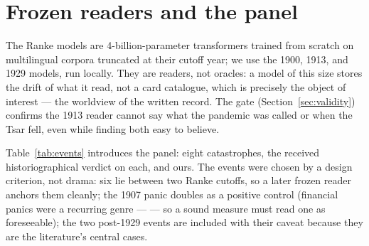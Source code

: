 \documentclass[11pt]{article}
\begin{document}
\section{Frozen readers and the panel}\label{sec:data}

The Ranke models are 4-billion-parameter transformers trained from scratch on multilingual corpora truncated
at their cutoff year; we use the 1900, 1913, and 1929 models, run locally. They are readers, not oracles: a
model of this size stores the drift of what it read, not a card catalogue, which is precisely the object of
interest --- the worldview of the written record. The gate (Section~\ref{sec:validity}) confirms the 1913
reader cannot say what the pandemic was called or when the Tsar fell, even while finding both easy to believe.

Table~\ref{tab:events} introduces the panel: eight catastrophes, the received historiographical verdict on
each, and ours. The events were chosen by a design criterion, not drama: six lie between two Ranke cutoffs,
so a later frozen reader anchors them cleanly; the 1907 panic doubles as a positive control (financial panics
were a recurring genre --- \citealp{bagehot1873} --- so a sound measure must read one as foreseeable); the two
post-1929 events are included with their caveat because they are the literature's central cases.
\end{document}
